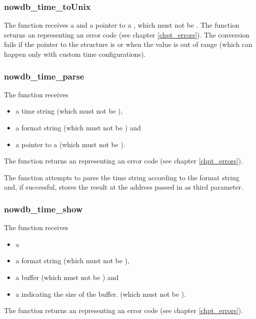\subsubsection{nowdb\_time\_toUnix}
The function receives a  
and a pointer to a  ,
which must not be .
The function returns an  representing
an error code (see chapter \ref{chpt_errors}).
The conversion fails if the pointer to the 
structure is  or when the
 value is out of range
(which can happen only with custom time configurations).

\subsubsection{nowdb\_time\_parse}
The function receives
\begin{itemize}
\item a time string (which must not be ),
\item a format string (which must not be ) and
\item a pointer to a 
(which must not be ).
\end{itemize}

The function returns an  representing
an error code (see chapter \ref{chpt_errors}).

The function attempts to parse the time string
according to the format string and, if successful,
stores the result at the address passed in as third parameter.

\subsubsection{nowdb\_time\_show}
The function receives
\begin{itemize}
\item a 
\item a format string (which must not be ),
\item a  buffer (which must not be ) and
\item a  indicating the size of the buffer.
(which must not be ).
\end{itemize}

The function returns an  representing
an error code (see chapter \ref{chpt_errors}).

